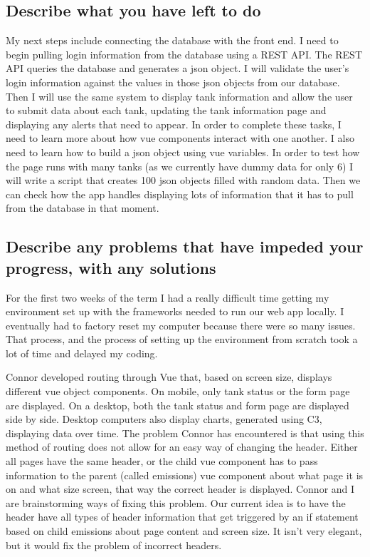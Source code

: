 \documentclass[draftclsnofoot,onecolumn,letterpaper,10pt,compsoc]{IEEEtran}
\begin{document}
\subsection{Describe what you have left to do}
My next steps include connecting the database with the front end. I need to begin pulling login information from the database using a REST API. The REST API queries the database and generates a json object. I will validate the user’s login information against the values in those json objects from our database. Then I will use the same system to display tank information and allow the user to submit data about each tank, updating the tank information page and displaying any alerts that need to appear. In order to complete these tasks, I need to learn more about how vue components interact with one another. I also need to learn how to build a json object using vue variables. In order to test how the page runs with many tanks (as we currently have dummy data for only 6) I will write a script that creates 100 json objects filled with random data. Then we can check how the app handles displaying lots of information that it has to pull from the database in that moment.


\subsection{Describe any problems that have impeded your progress, with any solutions}
For the first two weeks of the term I had a really difficult time getting my environment set up with the frameworks needed to run our web app locally. I eventually had to factory reset my computer because there were so many issues. That process, and the process of setting up the environment from scratch took a lot of time and delayed my coding.

Connor developed routing through Vue that, based on screen size, displays different vue object components. On mobile, only tank status or the form page are displayed. On a desktop, both the tank status and form page are displayed side by side. Desktop computers also display charts, generated using C3, displaying data over time. The problem Connor has encountered is that using this method of routing does not allow for an easy way of changing the header. Either all pages have the same header, or the child vue component has to pass information to the parent (called emissions) vue component about what page it is on and what size screen, that way the correct header is displayed. Connor and I are brainstorming ways of fixing this problem. Our current idea is to have the header have all types of header information that get triggered by an if statement based on child emissions about page content and screen size. It isn’t very elegant, but it would fix the problem of incorrect headers.
\end{document}
